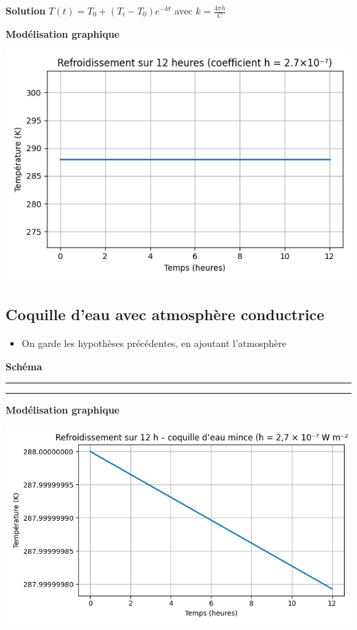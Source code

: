 \documentclass[a4paper,12pt]{article}
\begin{document}
\vspace{0.5cm}

\textbf{Solution} 
$T(t) = T_0 + (T_i - T_0)e^{-kt}$ \quad avec $k = \frac{4\pi h}{C}$
\\
\bigskip

\textbf{Modélisation graphique}
\begin{center}
  \includegraphics[width=0.8\linewidth]{../modele2/figures/modele2.png}
\end{center}
    
\vspace{1cm}
\subsection{Coquille d’eau avec atmosphère conductrice }
\begin{itemize}
    \item On garde les hypothèses précédentes, en ajoutant l'atmosphère \end{itemize}
\vspace{1cm}
\textbf{Schéma}
\\
\noindent\textcolor{gray}{\rule{\linewidth}{0.4pt}}

    
\begin{center}
  
\end{center}
\noindent\textcolor{gray}{\rule{\linewidth}{0.4pt}}
\vspace{0.5cm}
\textbf{Modélisation graphique}
\begin{center}
  \includegraphics[width=0.8\linewidth]{../modele2/figures/modele2_coquille.png}
\end{center}
        
\end{document}
